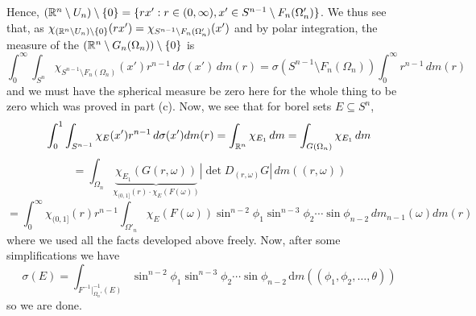 \documentclass[12pt,a4paper]{article}
\begin{document}
\begin{solution}
\begin{enumerate}[label=(\alph*)]
		Hence, $(\mathbb{R}^n\setminus U_n)\setminus\{0\}=\{rx':r\in(0,\infty),x'\in S^{n-1}\setminus F_n(\Omega_n')\}$. 
		We thus see that, as $\chi_{(\mathbb{R}^n\setminus U_n)\setminus\{0\}}(rx')=\chi_{S^{n-1}\setminus F_n(\Omega_n')}(x')$ and by polar integration, the measure of the $(\mathbb{R}^n\setminus G_n(\Omega_n))\setminus\{0\}$ is
		\[
			\int_0^\infty\int_{S^n}\chi_{S^{n-1}\setminus F_n(\Omega_n)}(x')r^{n-1}\,d\sigma(x')\,dm(r)=\sigma(S^{n-1}\setminus F_n(\Omega_n))\int_0^\infty r^{n-1}\,dm(r)
		\]
		and we must have the spherical measure be zero here for the whole thing to be zero which was proved in part (c). 
		Now, we see that for borel sets $E\subseteq S^n$, 
		\[
			\int_0^1\int_{S^{n-1}}\chi_E(x')r^{n-1}\,d\sigma(x')dm(r)=\int_{\mathbb{R}^n}\chi_{E_1}\,dm=\int_{G(\Omega_n)}\chi_{E_1}\,dm
		\]
		\[
		=\int_{\Omega_n}\underbrace{\chi_{E_1}(G(r,\omega))}_{\chi_{(0,1]}(r)\cdot\chi_E(F(\omega))}|\det D_{(r,\omega)}G|\,dm((r,\omega))
		\]
		\[
			=\int_0^\infty\chi_{(0,1]}(r)r^{n-1}\int_{\Omega'_n}\chi_{E}(F(\omega))\sin^{n-2}\phi_1\sin^{n-3}\phi_2\cdots\sin\phi_{n-2}\,dm_{n-1}(\omega)dm(r)
		\]
		where we used all the facts developed above freely. 
		Now, after some simplifications we have
		\[
		\sigma(E)=\int_{F^{-1}|_{\Omega_n'}^{-1}(E)}\sin^{n-2}\phi_1\sin^{n-3}\phi_2\cdots\sin\phi_{n-2}\,\mathrm{d}m((\phi_1,\phi_2,\ldots,\theta))
		\]	
		so we are done.
\end{enumerate}
\end{solution}
\end{document}
